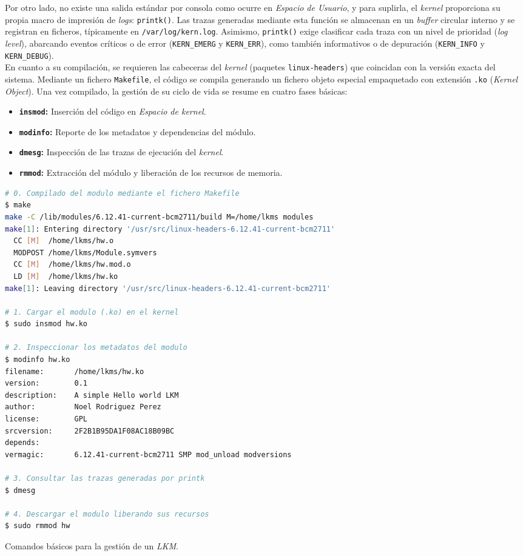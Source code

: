 Por otro lado, no existe una salida estándar por consola como ocurre en \textit{Espacio de Usuario}, y para suplirla, el \textit{kernel} proporciona su propia macro de impresión de \textit{logs}: \texttt{printk()}.
Las trazas generadas mediante esta función se almacenan en un \textit{buffer} circular interno y se registran en ficheros, típicamente en \texttt{/var/log/kern.log}.
Asimismo, \texttt{printk()} exige clasificar cada traza con un nivel de prioridad (\textit{log level}), abarcando eventos críticos o de error (\texttt{KERN\_EMERG} y \texttt{KERN\_ERR}), como también informativos o de depuración (\texttt{KERN\_INFO} y \texttt{KERN\_DEBUG}).\\

En cuanto a su compilación, se requieren las cabeceras del \textit{kernel} (paquetes \texttt{linux-headers}) que coincidan con la versión exacta del sistema.
Mediante un fichero \texttt{Makefile}, el código se compila generando un fichero objeto especial empaquetado con extensión \texttt{.ko} (\textit{Kernel Object}).
Una vez compilado, la gestión de su ciclo de vida se resume en cuatro fases básicas:

\begin{itemize}
    \item \textbf{\texttt{insmod}:} Inserción del código en \textit{Espacio de kernel}.
    \item \textbf{\texttt{modinfo}:} Reporte de los metadatos y dependencias del módulo.
    \item \textbf{\texttt{dmesg}:} Inspección de las trazas de ejecución del \textit{kernel}.
    \item \textbf{\texttt{rmmod}:} Extracción del módulo y liberación de los recursos de memoria.
\end{itemize}

\begin{code}[h!]
\begin{lstlisting}[language=bash]
# 0. Compilado del modulo mediante el fichero Makefile
$ make
make -C /lib/modules/6.12.41-current-bcm2711/build M=/home/lkms modules
make[1]: Entering directory '/usr/src/linux-headers-6.12.41-current-bcm2711'
  CC [M]  /home/lkms/hw.o
  MODPOST /home/lkms/Module.symvers
  CC [M]  /home/lkms/hw.mod.o
  LD [M]  /home/lkms/hw.ko
make[1]: Leaving directory '/usr/src/linux-headers-6.12.41-current-bcm2711'

# 1. Cargar el modulo (.ko) en el kernel
$ sudo insmod hw.ko

# 2. Inspeccionar los metadatos del modulo
$ modinfo hw.ko
filename:       /home/lkms/hw.ko
version:        0.1
description:    A simple Hello world LKM
author:         Noel Rodriguez Perez
license:        GPL
srcversion:     2F2B1B95DA1F08AC18B09BC
depends:        
vermagic:       6.12.41-current-bcm2711 SMP mod_unload modversions

# 3. Consultar las trazas generadas por printk
$ dmesg

# 4. Descargar el modulo liberando sus recursos
$ sudo rmmod hw
\end{lstlisting}
\caption[Comandos básicos de gestión de LKMs]{Comandos básicos para la gestión de un \textit{LKM}.}
\label{cod:lkm_commands}
\end{code}

